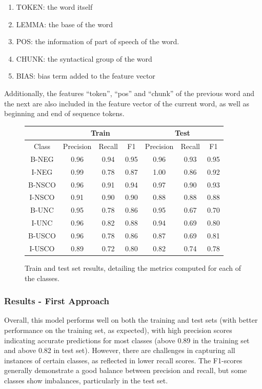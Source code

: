 \documentclass{article}
\begin{document}
\begin{enumerate}[itemsep=0.02cm]
	\item TOKEN: the word itself
	\item LEMMA: the base of the word
	\item POS: the information of part of speech of the word.
	\item CHUNK: the syntactical group of the word
	\item BIAS: bias term added to the feature vector
\end{enumerate}

Additionally, the features “token”, “pos” and “chunk” of the previous word and the next are also included in the
feature vector of the current word, as well as beginning and end of sequence tokens.

\begin{figure}[!t]
	\centering
	\begin{tabular}{|c|c|c|c|c|c|c|}
		\hline
		& \multicolumn{3}{|c|}{Train} & \multicolumn{3}{|c|}{Test} \\
		\hline
		Class & Precision & Recall & F1 & Precision & Recall & F1 \\
		\hline
		B-NEG & 0.96 & 0.94 & 0.95 & 0.96 & 0.93 & 0.95 \\
		\hline
		I-NEG & 0.99 & 0.78 & 0.87 & 1.00 & 0.86 & 0.92 \\
		\hline
		B-NSCO & 0.96 & 0.91 & 0.94 & 0.97 & 0.90 & 0.93 \\
		\hline
		I-NSCO & 0.91 & 0.90 & 0.90 & 0.88 & 0.88 & 0.88 \\
		\hline
		B-UNC & 0.95 & 0.78 & 0.86 & 0.95 & 0.67 & 0.70 \\
		\hline
		I-UNC & 0.96 & 0.82 & 0.88 & 0.94 & 0.69 & 0.80 \\
		\hline
		B-USCO & 0.96 & 0.78 & 0.86 & 0.87 & 0.69 & 0.81 \\
		\hline
		I-USCO & 0.89 & 0.72 & 0.80 & 0.82 & 0.74 & 0.78 \\
		\hline
	\end{tabular}
	\captionsetup{width=0.9\textwidth}
	\caption{Train and test set results, detailing the metrics computed for each of the classes.}
	\label{fig:crf_table}
\end{figure}

\subsubsection*{Results  - First Approach}
Overall, this model performs well on both the training and test sets (with better performance on the
training set, as expected), with high precision scores indicating accurate predictions for most classes
(above 0.89 in the training set and above 0.82 in test set). However, there are challenges in capturing
all instances of certain classes, as reflected in lower recall scores. The F1-scores generally demonstrate
a good balance between precision and recall, but some classes show imbalances, particularly in the test set.
\end{document}
